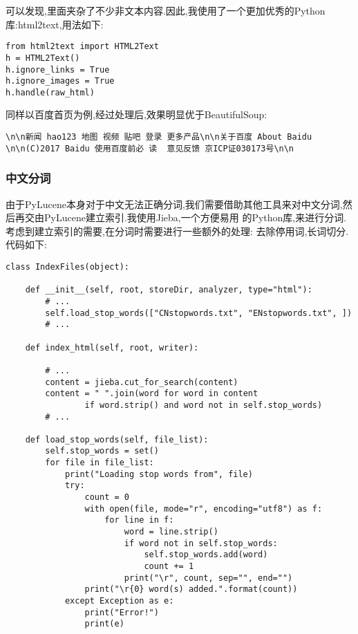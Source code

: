 \documentclass[a4paper]{article}
\begin{document}
可以发现,里面夹杂了不少非文本内容.因此,我使用了一个更加优秀的Python库:html2text,用法如下:
\begin{verbatim}
from html2text import HTML2Text
h = HTML2Text()
h.ignore_links = True
h.ignore_images = True
h.handle(raw_html)
\end{verbatim}

同样以百度首页为例,经过处理后,效果明显优于BeautifulSoup:
\begin{verbatim}
\n\n新闻 hao123 地图 视频 贴吧 登录 更多产品\n\n关于百度 About Baidu
\n\n(C)2017 Baidu 使用百度前必 读  意见反馈 京ICP证030173号\n\n
\end{verbatim}
        \subsubsection{中文分词}
由于PyLucene本身对于中文无法正确分词,我们需要借助其他工具来对中文分词,然后再交由PyLucene建立索引.我使用Jieba,一个方便易用
的Python库,来进行分词. 考虑到建立索引的需要,在分词时需要进行一些额外的处理: 去除停用词,长词切分.代码如下:
\begin{verbatim}
class IndexFiles(object):

    def __init__(self, root, storeDir, analyzer, type="html"):
        # ...
        self.load_stop_words(["CNstopwords.txt", "ENstopwords.txt", ])
        # ...

    def index_html(self, root, writer):

        # ...
        content = jieba.cut_for_search(content)
        content = " ".join(word for word in content
                if word.strip() and word not in self.stop_words)
        # ...

    def load_stop_words(self, file_list):
        self.stop_words = set()
        for file in file_list:
            print("Loading stop words from", file)
            try:
                count = 0
                with open(file, mode="r", encoding="utf8") as f:
                    for line in f:
                        word = line.strip()
                        if word not in self.stop_words:
                            self.stop_words.add(word)
                            count += 1
                        print("\r", count, sep="", end="")
                print("\r{0} word(s) added.".format(count))
            except Exception as e:
                print("Error!")
                print(e)
\end{verbatim}
\end{document}
